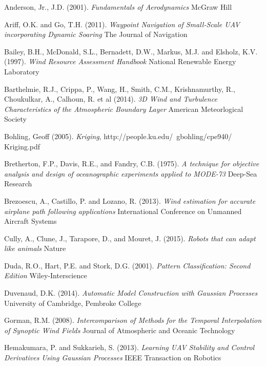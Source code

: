 \documentclass[12pt]{report}
\begin{document}
\begin{thebibliography}{10}%

	Anderson, Jr., J.D. (2001). \emph{Fundamentals of Aerodynamics} McGraw Hill

	Ariff, O.K. and Go, T.H. (2011). \emph{Waypoint Navigation of Small-Scale UAV incorporating Dynamic Soaring} The Journal of Navigation

	Bailey, B.H., McDonald, S.L., Bernadett, D.W., Markus, M.J. and Elsholz, K.V. (1997). \emph{Wind Resource Assessment Handbook} National Renewable Energy Laboratory

	Barthelmie, R.J., Crippa, P., Wang, H., Smith, C.M., Krishnamurthy, R., Choukulkar, A., Calhoun, R. et al (2014). \emph{3D Wind and Turbulence Characteristics of the Atmospheric Boundary Layer} American Meteorlogical Society

	Bohling, Geoff (2005). \emph{Kriging},
http://people.ku.edu/~gbohling/cpe940/ Kriging.pdf
	
	Bretherton, F.P., Davis, R.E., and Fandry, C.B. (1975). \emph{A technique for objective analysis and design of oceanographic experiments applied to MODE-73} Deep-Sea Research
	
	Brezoescu, A., Castillo, P. and Lozano, R. (2013). \emph{Wind estimation for accurate airplane path following applications} International Conference on Unmanned Aircraft Systems	
	
	Cully, A., Clune, J., Tarapore, D., and Mouret, J. (2015). \emph{Robots that can adapt like animals} Nature	
	
	Duda, R.O., Hart, P.E. and Stork, D.G. (2001). \emph{Pattern Classification: Second Edition} Wiley-Interscience
	
	Duvenaud, D.K. (2014). \emph{Automatic Model Construction with Gaussian Processes} University of Cambridge, Pembroke College

	Gorman, R.M. (2008). \emph{Intercomparison of Methods for the Temporal Interpolation of Synoptic Wind Fields} Journal of Atmospheric and Oceanic Technology
	
	Hemakumara, P. and Sukkarieh, S. (2013). \emph{Learning UAV Stability and Control Derivatives Using Gaussian Processes} IEEE Transaction on Robotics


\end{thebibliography}
\end{document}
